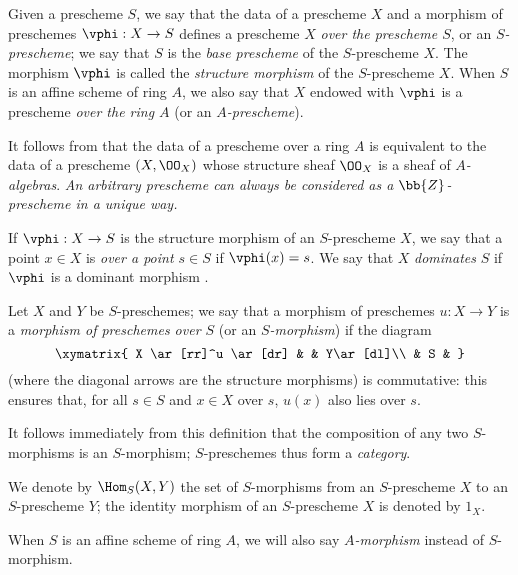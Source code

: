 \begin{defn}[2.5.1]
\label{1.2.5.1}
Given a prescheme $S$, we say that the data of a prescheme $X$ and a morphism of preschemes $\vphi:X\to S$ defines a prescheme $X$ \emph{over the prescheme $S$}, or an \emph{$S$-prescheme};
we say that $S$ is the \emph{base prescheme} of the $S$-prescheme $X$.
The morphism $\vphi$ is called the \emph{structure morphism} of the $S$-prescheme $X$.
When $S$ is an affine scheme of ring $A$, we also say that $X$ endowed with $\vphi$ is a prescheme \emph{over the ring $A$} (or an \emph{$A$-prescheme}).
\end{defn}

It follows from  that the data of a prescheme over a ring $A$ is equivalent to the data of a prescheme $(X,\OO_X)$ whose structure sheaf $\OO_X$ is a sheaf of \emph{$A$-algebras}.
\emph{An arbitrary prescheme can always be considered as a $\bb{Z}$-prescheme in a unique way.}

If $\vphi:X\to S$ is the structure morphism of an $S$-prescheme $X$, we
say that a point $x\in X$ is \emph{over a point $s\in S$} if $\vphi(x)=s$. We
say that $X$ \emph{dominates} $S$ if $\vphi$ is a dominant morphism .

\begin{env}[2.5.2]
\label{1.2.5.2}
Let $X$ and $Y$ be $S$-preschemes;
we say that a morphism of preschemes $u:X\to Y$ is a \emph{morphism of preschemes over $S$} (or an \emph{$S$-morphism}) if the diagram
\[
  \xymatrix{
    X \ar[rr]^u \ar[dr] & & Y\ar[dl]\\
    & S &
  }
\]
(where the diagonal arrows are the structure morphisms) is commutative: this ensures that, for all $s\in S$ and $x\in X$ over $s$, $u(x)$ also lies over $s$.
\end{env}

It follows immediately from this definition that the composition of any two $S$-morphisms is an $S$-morphism;
$S$-preschemes thus form a \emph{category}.

We denote by $\Hom_S(X,Y)$ the set of $S$-morphisms from an $S$-prescheme $X$ to an $S$-prescheme $Y$;
the identity morphism of an $S$-prescheme $X$ is denoted by $1_X$.

When $S$ is an affine scheme of ring $A$, we will also say \emph{$A$-morphism} instead of $S$-morphism.

